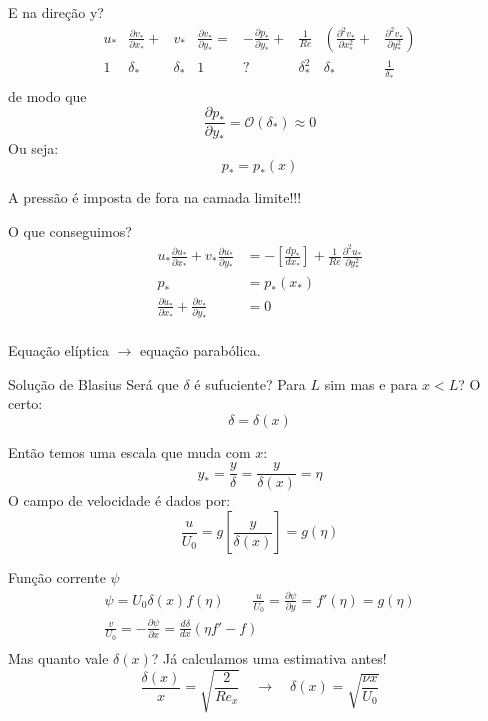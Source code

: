 \documentclass{beamer}
\newcommand{\lra}{\ensuremath{\longrightarrow}}
\newcommand{\qrq}{\ensuremath{\quad\lra\quad}}
\newcommand{\bigO}[1]{\ensuremath{\mathcal{O}\left(#1\right)}}
\begin{document}
\begin{frame}{E na direção y?}
\[
\begin{matrix}
u_*&\frac{\partial v_*}{\partial x_*} + &v_*&\frac{\partial v_*}{\partial y_*} =& 
-\frac{\partial p_*}{\partial y_*} + &\frac{1}{Re} &\left( \frac{\partial^2 v_*}{\partial x_*^2}\right. +& \left.\frac{\partial^2 v_*}{\partial y_*^2}\right) \\
 1 & \delta_* & \delta_* & 1 & ? & \delta_*^2 & \delta_* & \frac{1}{\delta_*} \\
\end{matrix}
\]
de modo que 
\[
\frac{\partial p_*}{\partial y_*} = \bigO{\delta_*} \approx 0
\]
Ou seja:
\[
p_* = p_*(x)
\]

\vspace{1cm}
A pressão é imposta de fora na camada limite!!!
\end{frame}

\begin{frame}{O que conseguimos?}
    \begin{align*}
    u_*\frac{\partial u_*}{\partial x_*} + v_*\frac{\partial u_*}{\partial y_*} &= 
    -\left[\frac{dp_*}{dx_*}\right] + \frac{1}{Re} \frac{\partial^2 u_*}{\partial y_*^2} \\
    p_* &= p_*(x_*)\\
    \frac{\partial u_*}{\partial x_*} + \frac{\partial v_*}{\partial y_*} &= 0\\
  \end{align*}

    Equação elíptica $\lra$ equação parabólica.
\end{frame}
\begin{frame}{Solução de Blasius}
  Será que $\delta$ é sufuciente? Para $L$ sim mas e para $x < L$? O certo:
  \[
  \delta = \delta(x)
  \]

  Então temos uma escala que muda com $x$:
\[
y_* = \frac{y}{\delta} = \frac{y}{\delta(x)} = \eta
\]
O campo de velocidade é dados por:
\[
\frac{u}{U_0} = g\left[\frac{y}{\delta(x)}\right] = g(\eta)
\]
 
\end{frame}

\begin{frame}{Função corrente $\psi$}
  \begin{multline*}
    \psi = U_0 \delta(x) f(\eta) \qquad \frac{u}{U_0} = \frac{\partial\psi}{\partial y}=f'(\eta)=g(\eta) \\
    \frac{v}{U_0} =-\frac{\partial\psi}{\partial x} = \frac{d\delta}{dx}\left(\eta f' - f\right)\\
\end{multline*}
Mas quanto vale $\delta(x)$? Já calculamos uma estimativa antes!
\[
  \frac{\delta(x)}{x} = \sqrt{\frac{2}{Re_x}} \qrq \delta(x) = \sqrt{\frac{\nu x}{U_0}}
  \]

\end{frame}
\end{document}
